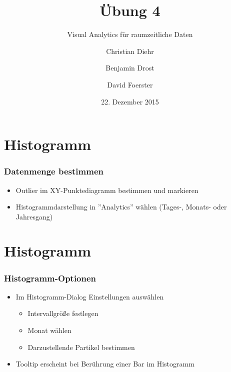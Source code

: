 \documentclass{beamer}
\title{Übung 4}
\subtitle{Visual Analytics für raumzeitliche Daten}
\author{Christian Diehr \and Benjamin Drost \and David Foerster}
\institute{Institut für Informatik\\Humboldt-Universität zu Berlin}
\date{22. Dezember 2015}
\begin{document}
    \begin{frame}
        \titlepage
    \end{frame}
    \logo %
        
    \section{Histogramm}
    \begin{frame}
			\frametitle{Datenmenge bestimmen}
			\begin{itemize}
				\setlength\itemsep{1em}
				\item Outlier im XY-Punktediagramm bestimmen und markieren				
				\item Histogrammdarstellung in ''Analytics''  wählen (Tages-, Monats- oder Jahresgang)
			\end{itemize}
    \end{frame}
    
    \section{Histogramm}
    \begin{frame}
			\frametitle{Histogramm-Optionen}
			\begin{itemize}
				\setlength\itemsep{1em}
				\item Im Histogramm-Dialog Einstellungen auswählen
				\begin{itemize}
					\setlength\itemsep{1em}
					\item Intervallgröße festlegen 
					\item Monat wählen
					\item Darzustellende Partikel bestimmen				
				\end{itemize}
				\item Tooltip erscheint bei Berührung einer Bar im Histogramm				
			\end{itemize}
    \end{frame}
\end{document}
